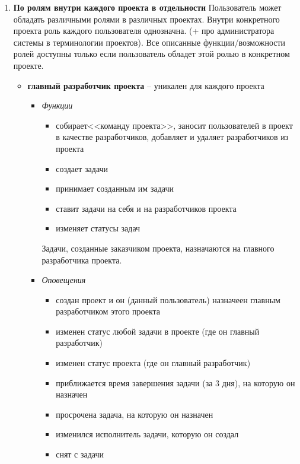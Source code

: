 \documentclass[14pt,a4paper]{extarticle}
\begin{document}
\begin{enumerate}
		\item {\bf По ролям внутри каждого проекта в отдельности}
		Пользователь может обладать различными ролями в различных проектах. Внутри конкретного проекта роль каждого пользователя однозначна. (+ про администратора системы в терминологии проектов). Все описанные функции/возможности ролей доступны только если пользователь обладет этой ролью в конкретном проекте.
		\begin{itemize}
			\item {\bf главный разработчик проекта} -- уникален для каждого проекта
			\begin{itemize}
				\item {\it Функции}
				\begin{itemize}
					\item собирает<<команду проекта>>, заносит пользователей в проект в качестве разработчиков, добавляет и удаляет разработчиков из проекта
					\item создает задачи
					\item принимает созданным им задачи
					\item ставит задачи на себя и на разработчиков проекта
					\item изменяет статусы задач
				\end{itemize}
				Задачи, созданные заказчиком проекта, назначаются на главного разработчика проекта.
				
				\item {\it Оповещения}
				\begin{itemize}
					\item создан проект и он (данный пользователь) назначеен главным разработчиком этого проекта
					
					\item изменен статус любой задачи в проекте (где он главный разработчик)
					
					\item изменен статус проекта (где он главный разработчик)
					
					\item приближается время завершения задачи (за 3 дня), на которую он назначен
					
					\item просрочена задача, на которую он назначен
					
					\item изменился исполнитель задачи, которую он создал
					
					\item снят с задачи
				\end{itemize}
			\end{itemize}
			

\end{itemize}
\end{enumerate}
\end{document}
